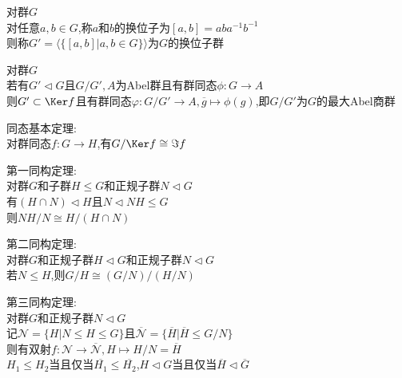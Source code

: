 \begin{dingyi}
对群$G$\\
对任意$a,b\in G$,称$a$和$b$的换位子为$[a,b]=aba^{-1}b^{-1}$\\
则称$G'=\langle\{[a,b]|a,b\in G\}\rangle$为$G$的换位子群
\end{dingyi}

\begin{dingli}
对群$G$\\
若有$G'\lhd G$且$G/G',A$为Abel群且有群同态$\phi:G\to A$\\
则$G'\subset\Ker f$且有群同态$\varphi:G/G'\to A,\overline{g}\mapsto \phi(g)$,即$G/G'$为$G$的最大Abel商群
\end{dingli}

\begin{dingli}
同态基本定理:\\
对群同态$f:G\to H$,有$G/\Ker f\cong \Im f$
\end{dingli}

\begin{dingli}
第一同构定理:\\
对群$G$和子群$H\leq G$和正规子群$N\lhd G$\\
有$(H\cap N)\lhd H$且$N\lhd NH\leq G$\\
则$NH/N\cong H/(H\cap N)$
\end{dingli}

\begin{dingli}
第二同构定理:\\
对群$G$和正规子群$H\lhd G$和正规子群$N\lhd G$\\
若$N\leq H$,则$G/H\cong(G/N)/(H/N)$
\end{dingli}

\begin{dingli}
第三同构定理:\\
对群$G$和正规子群$N\lhd G$\\
记$\mathscr{N}=\{H|N\leq H\leq G\}$且$\overline{\mathscr{N}}=\{\overline{H}|\overline{H}\leq G/N\}$\\
则有双射$f:\mathscr{N}\to \overline{\mathscr{N}},H\mapsto H/N=\overline{H}$\\
$H_1\leq H_2$当且仅当$\overline{H_1}\leq \overline{H_2}$,$H\lhd G$当且仅当$\overline{H}\lhd \overline{G}$
\end{dingli}

